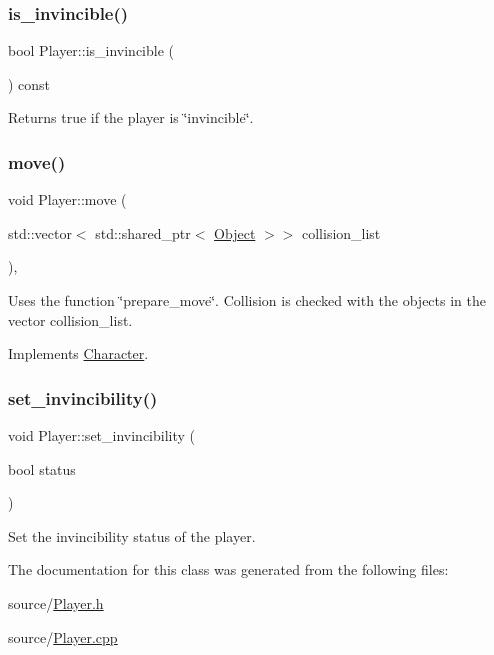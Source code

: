 \subsubsection{\texorpdfstring{is\+\_\+invincible()}{is\_invincible()}}
{\footnotesize\ttfamily bool Player\+::is\+\_\+invincible (\begin{DoxyParamCaption}{ }\end{DoxyParamCaption}) const}

Returns true if the player is \char`\"{}invincible\char`\"{}. \mbox{\label{classPlayer_ace418f6e52cafc354f57268cfe4b646a}} 
\subsubsection{\texorpdfstring{move()}{move()}}
{\footnotesize\ttfamily void Player\+::move (\begin{DoxyParamCaption}\item[{std\+::vector$<$ std\+::shared\+\_\+ptr$<$ \hyperlink{classObject}{Object} $>$$>$}]{collision\+\_\+list }\end{DoxyParamCaption})\hspace{0.3cm}{\ttfamily [override]}, {\ttfamily [virtual]}}

Uses the function \char`\"{}prepare\+\_\+move\char`\"{}. Collision is checked with the objects in the vector collision\+\_\+list. 

Implements \hyperlink{classCharacter_a91211cae08aab6a74b43377e4463283a}{Character}.

\mbox{\label{classPlayer_a8ca5d55325b3037c2123b88f1bd3412d}} 
\subsubsection{\texorpdfstring{set\+\_\+invincibility()}{set\_invincibility()}}
{\footnotesize\ttfamily void Player\+::set\+\_\+invincibility (\begin{DoxyParamCaption}\item[{bool}]{status }\end{DoxyParamCaption})}

Set the invincibility status of the player. 

The documentation for this class was generated from the following files\+:\begin{DoxyCompactItemize}
\item 
source/\hyperlink{Player_8h}{Player.\+h}\item 
source/\hyperlink{Player_8cpp}{Player.\+cpp}\end{DoxyCompactItemize}
